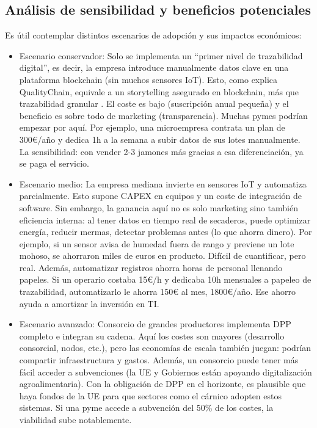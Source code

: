\subsection{Análisis de sensibilidad y beneficios potenciales}
Es útil contemplar distintos escenarios de adopción y sus impactos económicos:
\begin{itemize}
    \item Escenario conservador: Solo se implementa un “primer nivel de trazabilidad digital”, es decir, la empresa introduce manualmente datos clave en una plataforma blockchain (sin muchos sensores IoT). Esto, como explica QualityChain, equivale a un storytelling asegurado en blockchain, más que trazabilidad granular \cite{salaris_trazabilidad_2020}. El coste es bajo (suscripción anual pequeña) y el beneficio es sobre todo de marketing (transparencia). Muchas pymes podrían empezar por aquí. Por ejemplo, una microempresa contrata un plan de 300€/año y dedica 1h a la semana a subir datos de sus lotes manualmente. La sensibilidad: con vender 2-3 jamones más gracias a esa diferenciación, ya se paga el servicio.
    \item Escenario medio: La empresa mediana invierte en sensores IoT y automatiza parcialmente. Esto supone CAPEX en equipos y un coste de integración de software. Sin embargo, la ganancia aquí no es solo marketing sino también eficiencia interna: al tener datos en tiempo real de secaderos, puede optimizar energía, reducir mermas, detectar problemas antes (lo que ahorra dinero). Por ejemplo, si un sensor avisa de humedad fuera de rango y previene un lote mohoso, se ahorraron miles de euros en producto. Difícil de cuantificar, pero real. Además, automatizar registros ahorra horas de personal llenando papeles. Si un operario costaba 15€/h y dedicaba 10h mensuales a papeleo de trazabilidad, automatizarlo le ahorra 150€ al mes, 1800€/año. Ese ahorro ayuda a amortizar la inversión en TI.
    \item Escenario avanzado: Consorcio de grandes productores implementa DPP completo e integran su cadena. Aquí los costes son mayores (desarrollo consorcial, nodos, etc.), pero las economías de escala también juegan: podrían compartir infraestructura y gastos. Además, un consorcio puede tener más fácil acceder a subvenciones (la UE y Gobiernos están apoyando digitalización agroalimentaria). Con la obligación de DPP en el horizonte, es plausible que haya fondos de la UE para que sectores como el cárnico adopten estos sistemas. Si una pyme accede a subvención del 50\% de los costes, la viabilidad sube notablemente.
\end{itemize}

